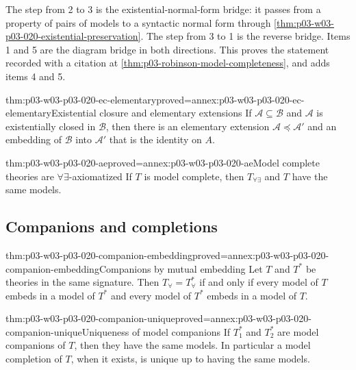 The step from 2 to 3 is the existential-normal-form bridge: it passes from a
property of pairs of models to a syntactic normal form through
\cref{thm:p03-w03-p03-020-existential-preservation}. The step from 3 to 1
is the reverse bridge. Items 1 and 5 are the diagram bridge in both
directions. This proves the statement recorded with a citation at
\cref{thm:p03-robinson-model-completeness}, and adds items 4 and 5.

\begin{hblemma}{thm:p03-w03-p03-020-ec-elementary}{proved=annex:p03-w03-p03-020-ec-elementary}{Existential closure and elementary extensions}
If \(\mathcal A\subseteq\mathcal B\) and \(\mathcal A\) is existentially
closed in \(\mathcal B\), then there is an elementary extension
\(\mathcal A\preccurlyeq\mathcal A'\) and an embedding of \(\mathcal B\)
into \(\mathcal A'\) that is the identity on \(A\).
\end{hblemma}

\begin{hbtheorem}{thm:p03-w03-p03-020-ae}{proved=annex:p03-w03-p03-020-ae}{Model complete theories are \(\forall\exists\)-axiomatized}
If \(T\) is model complete, then \(T_{\forall\exists}\) and \(T\) have the
same models.
\end{hbtheorem}

\subsection{Companions and completions}
\label{sec:p03-w03-p03-020-companions}

\begin{hblemma}{thm:p03-w03-p03-020-companion-embedding}{proved=annex:p03-w03-p03-020-companion-embedding}{Companions by mutual embedding}
Let \(T\) and \(T^*\) be theories in the same signature. Then
\(T_\forall=T^*_\forall\) if and only if every model of \(T\) embeds in a
model of \(T^*\) and every model of \(T^*\) embeds in a model of \(T\).
\end{hblemma}

\begin{hbtheorem}{thm:p03-w03-p03-020-companion-unique}{proved=annex:p03-w03-p03-020-companion-unique}{Uniqueness of model companions}
If \(T_1^*\) and \(T_2^*\) are model companions of \(T\), then they have
the same models. In particular a model completion of \(T\), when it exists,
is unique up to having the same models.
\end{hbtheorem}

